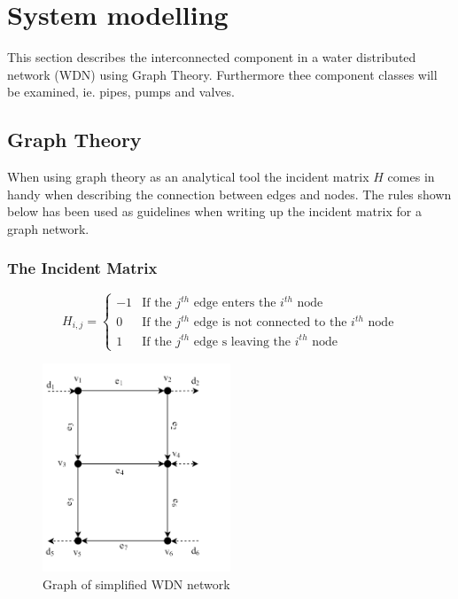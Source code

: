 \section{System modelling }
This section describes the interconnected component in a water distributed network (WDN) using Graph Theory. Furthermore thee component classes will be examined, ie. pipes, pumps and valves.


\subsection{Graph Theory}
When using graph theory as an analytical tool the incident matrix $H$ comes in handy when describing the connection between edges and nodes. The rules shown below has been used as guidelines when writing up the incident matrix for a graph network. 

\subsubsection{The Incident Matrix}
\begin{equation*}
H_{i,j} = \begin{cases}
    -1 & \text{If the $j^{th}$ edge enters the $i^{th}$ node} \\
    0 & \text{If the $j^{th}$ edge is not connected to the $i^{th}$ node} \\
    1 & \text{If the $j^{th}$ edge s leaving the $i^{th}$ node}
\end{cases}
\end{equation*} %

\begin{figure}[h!]
	\centering
	\includegraphics[width=0.5\textwidth]{Pictures/Graph.png}
	\caption{Graph of simplified WDN network \cite{Rathore930}}
	\label{fig:graph}
\end{figure}


